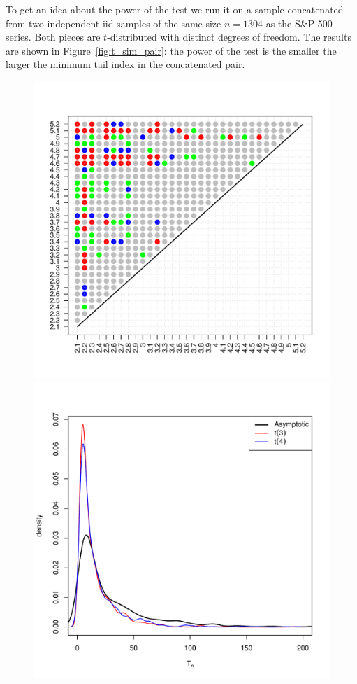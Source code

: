 \documentclass[11pt,a4]{amsart}
\newcommand{\1}{{\mathbf 1}}
\begin{document}
\par
To get an idea about the power of the test we run it on a
sample concatenated from two independent iid samples of the same size
$n=1304$ as the S\&P 500 series. Both pieces are $t$-distributed with
distinct degrees of freedom. The results are shown in
Figure~\ref{fig:t_sim_pair}: the power of the test is the smaller the
larger the minimum tail index in the concatenated pair.
\begin{figure}[htb!]
  \begin{minipage}{0.5\linewidth}
    \includegraphics[width=\textwidth]{t_sim_pair.pdf}
  \end{minipage}\hfill
  \begin{minipage}{0.5\linewidth}
    \includegraphics[width=\textwidth]{Hoga_AsymptoticDistribution.pdf}

\end{minipage}
\end{figure}
\end{document}
